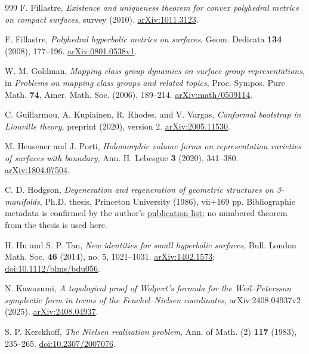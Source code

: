 \documentclass[11pt,a4paper]{article}
\numberwithin{equation}{section}
\theoremstyle{definition}
\theoremstyle{remark}
\begin{document}
\begin{thebibliography}{999}
F. Fillastre,
\emph{Existence and uniqueness theorem for convex polyhedral metrics on
compact surfaces}, survey (2010).
\href{https://arxiv.org/abs/1011.3123}{arXiv:1011.3123}.

F. Fillastre,
\emph{Polyhedral hyperbolic metrics on surfaces},
Geom. Dedicata \textbf{134} (2008), 177--196.
\href{https://arxiv.org/abs/0801.0538v1}{arXiv:0801.0538v1}.

W. M. Goldman,
\emph{Mapping class group dynamics on surface group representations},
in \emph{Problems on mapping class groups and related topics},
Proc. Sympos. Pure Math. \textbf{74}, Amer. Math. Soc. (2006), 189--214.
\href{https://arxiv.org/abs/math/0509114}{arXiv:math/0509114}.

C. Guillarmou, A. Kupiainen, R. Rhodes, and V. Vargas,
\emph{Conformal bootstrap in Liouville theory},
preprint (2020), version 2.
\href{https://arxiv.org/abs/2005.11530}{arXiv:2005.11530}.

M. Heusener and J. Porti,
\emph{Holomorphic volume forms on representation varieties of surfaces
with boundary}, Ann. H. Lebesgue \textbf{3} (2020), 341--380.
\href{https://arxiv.org/abs/1804.07504}{arXiv:1804.07504}.

C. D. Hodgson,
\emph{Degeneration and regeneration of geometric structures on 3-manifolds},
Ph.D. thesis, Princeton University (1986), vii+169 pp.
Bibliographic metadata is confirmed by the author's
\href{https://researchers.ms.unimelb.edu.au/~craigdh@unimelb/public.html}{publication list};
no numbered theorem from the thesis is used here.

H. Hu and S. P. Tan,
\emph{New identities for small hyperbolic surfaces},
Bull. London Math. Soc. \textbf{46} (2014), no. 5, 1021--1031.
\href{https://arxiv.org/abs/1402.1573}{arXiv:1402.1573};
\href{https://doi.org/10.1112/blms/bdu056}{doi:10.1112/blms/bdu056}.

N. Kawazumi,
\emph{A topological proof of Wolpert's formula for the Weil--Petersson
symplectic form in terms of the Fenchel--Nielsen coordinates},
arXiv:2408.04937v2 (2025).
\href{https://arxiv.org/abs/2408.04937}{arXiv:2408.04937}.

S. P. Kerckhoff,
\emph{The Nielsen realization problem},
Ann. of Math. (2) \textbf{117} (1983), 235--265.
\href{https://doi.org/10.2307/2007076}{doi:10.2307/2007076}.


\end{thebibliography}
\end{document}
